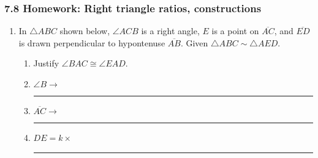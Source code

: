 \documentclass[12pt, twoside]{article}
\begin{document}
\subsubsection*{7.8 Homework: Right triangle ratios, constructions}
  \begin{enumerate}

  \item In $\triangle ABC$ shown below, $\angle ACB$ is a right angle, $E$ is a point on $\overline{AC}$, and $\overline{ED}$ is drawn perpendicular to hypontenuse $\overline{AB}$. Given $\triangle ABC \sim \triangle AED$.
  \begin{multicols}{2}
    \begin{enumerate}[itemsep=0.7cm]
      \item Justify $\angle BAC \cong \angle EAD$.
      \item $\angle B \rightarrow$ \quad \rule{2cm}{0.15mm} 
      \item $\overline{AC} \rightarrow$ \quad \rule{2cm}{0.15mm}
      \item $DE = k \times $ \ \rule{2cm}{0.15mm}
      \end{enumerate}
      \begin{center}
      \end{center} 
    \end{multicols}


\end{enumerate}
\end{document}
